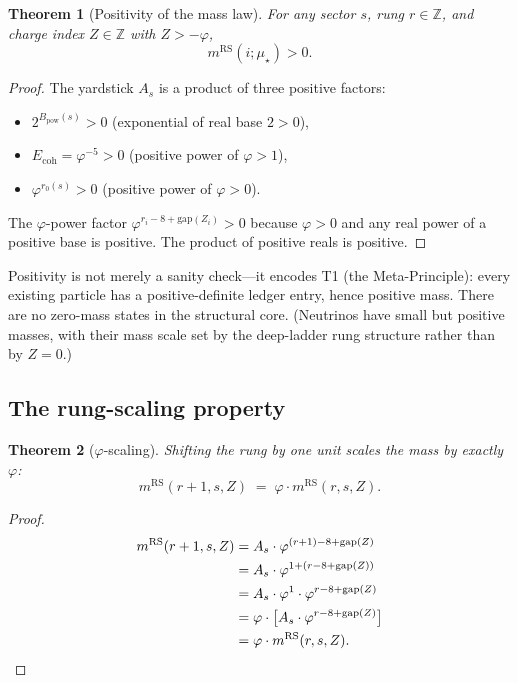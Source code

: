 \documentclass[11pt,a4paper]{article}
\newtheorem{theorem}{Theorem}[section]
\theoremstyle{definition}
\theoremstyle{remark}
\newcommand{\phig}{\varphi}
\newcommand{\Ecoh}{E_{\mathrm{coh}}}
\newcommand{\muStar}{\mu_{\star}}
\newcommand{\mRS}{m^{\mathrm{RS}}}
\newcommand{\Zidx}{Z}
\begin{document}
\begin{theorem}[Positivity of the mass law]
\label{thm:mass_pos}
For any sector $s$, rung $r \in \mathbb{Z}$, and charge index
$\Zidx \in \mathbb{Z}$ with $\Zidx > -\phig$,
\begin{equation}
  \mRS(i;\muStar) > 0.
  \label{eq:mass_pos}
\end{equation}
\end{theorem}

\begin{proof}
The yardstick $A_s$ is a product of three positive factors:
\begin{itemize}[nosep]
  \item $2^{B_{\mathrm{pow}}(s)} > 0$ (exponential of real base $2 > 0$),
  \item $\Ecoh = \phig^{-5} > 0$ (positive power of $\phig > 1$),
  \item $\phig^{r_0(s)} > 0$ (positive power of $\phig > 0$).
\end{itemize}
The $\phig$-power factor $\phig^{r_i - 8 + \mathrm{gap}(\Zidx_i)} > 0$
because $\phig > 0$ and any real power of a positive base is positive.
The product of positive reals is positive.
\end{proof}

\noindent
Positivity is not merely a sanity check---it encodes T1 (the Meta-Principle):
every existing particle has a positive-definite ledger entry, hence positive
mass.  There are no zero-mass states in the structural core.  (Neutrinos have
small but positive masses, with their mass scale set by the deep-ladder rung
structure rather than by $\Zidx = 0$.)

\subsection{The rung-scaling property}

\begin{theorem}[$\phig$-scaling]
\label{thm:phi_scaling}
Shifting the rung by one unit scales the mass by exactly~$\phig$:
\begin{equation}
  \mRS(r+1, s, \Zidx) \;=\; \phig \cdot \mRS(r, s, \Zidx).
  \label{eq:phi_scaling}
\end{equation}
\end{theorem}

\begin{proof}
\begin{align*}
  \mRS(r+1, s, \Zidx)
  &= A_s \cdot \phig^{(r+1) - 8 + \mathrm{gap}(\Zidx)} \\
  &= A_s \cdot \phig^{1 + (r - 8 + \mathrm{gap}(\Zidx))} \\
  &= A_s \cdot \phig^1 \cdot \phig^{r - 8 + \mathrm{gap}(\Zidx)} \\
  &= \phig \cdot \bigl[A_s \cdot \phig^{r - 8 + \mathrm{gap}(\Zidx)}\bigr] \\
  &= \phig \cdot \mRS(r, s, \Zidx). \qedhere
\end{align*}
\end{proof}
\end{document}
